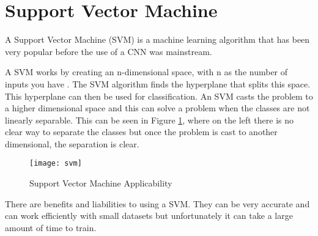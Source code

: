 \section{Support Vector Machine}
A Support Vector Machine (SVM) is a machine learning algorithm that has been
very popular before the use of a CNN was mainstream.

A SVM works by creating an n-dimensional space, with n as the number of
inputs you have \textcite{svm}. The SVM algorithm finds the hyperplane that splits this space.
This hyperplane can then be used for classification. 
An SVM casts the problem to a higher dimensional space and this can solve a problem when the classes are not linearly separable.
This can be seen in Figure \ref{fig:svm}, where on the left there is no clear way to separate the classes but once the problem is cast to another dimensional, the separation is clear.

\begin{figure}
    \texttt{[image: svm]}
    \caption{Support Vector Machine Applicability}
    \label{fig:svm}
\end{figure}

There are benefits and liabilities to using a SVM.
They can be very accurate and can work efficiently with small datasets but unfortunately it can take a large amount of time to train. 